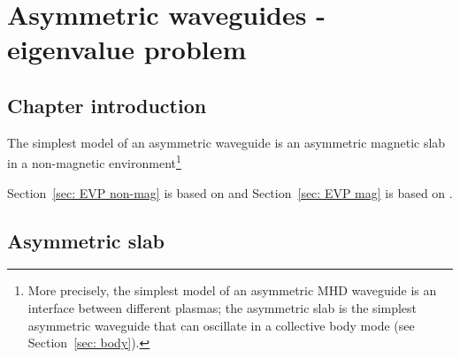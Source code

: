 \documentclass[12pt]{../style-files/ociamthesis}
\begin{document}
\baselineskip=18pt

\setcounter{secnumdepth}{3}
\setcounter{tocdepth}{3}

\setcounter{chapter}{1}


\newcommand{\bv}{\mathbf{v}}
\newcommand{\bB}{\mathbf{B}}


\newcommand{\figdir}{../main/figures/chpt-2/} %

\chapter{Asymmetric waveguides - eigenvalue problem}
\label{chap: EVP}


\section{Chapter introduction}
\label{sec: EVP intro}

The simplest model of an asymmetric waveguide is an asymmetric magnetic slab in a non-magnetic environment\footnote{More precisely, the simplest model of an asymmetric MHD waveguide is an interface between different plasmas; the asymmetric slab is the simplest asymmetric waveguide that can oscillate in a collective body mode (see Section~\ref{sec: body}).}

Section~\ref{sec: EVP non-mag} is based on \cite{all_etal17} and Section~\ref{sec: EVP mag} is based on \cite{zsa_etal18}.

\section{Asymmetric slab}
\label{sec: asym slab}
\end{document}
